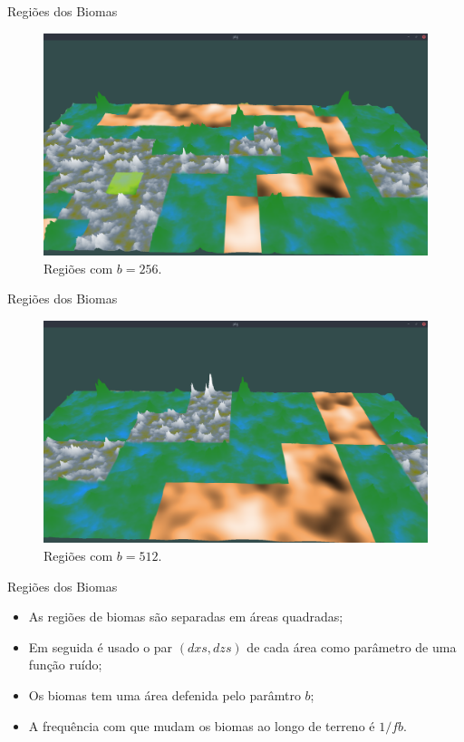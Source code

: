 \begin{frame}{Regiões dos Biomas}
    \begin{figure}[H]
        \centering
        \includegraphics[width=.9\textwidth]{img/re2bfb/b/256f4.png}
        \caption{Regiões com $b = 256$.}
        \label{fig:img_re2bfb_b_256f4}
    \end{figure}
    
    
\end{frame}

\begin{frame}{Regiões dos Biomas}
    \begin{figure}[H]
        \centering
        \includegraphics[width=.9\textwidth]{img/re2bfb/b/512f4.png}
        \caption{Regiões com $b = 512$.}
        \label{fig:img_re2bfb_b_512f4}
    \end{figure}
    
    
\end{frame}

\begin{frame}{Regiões dos Biomas}
    \begin{itemize} \setlength\itemsep{1em}
        \item As regiões de biomas são separadas em áreas quadradas;
        \item Em seguida é usado o par $(dxs, dzs)$ de cada área como parâmetro 
        de uma função ruído;
        \item Os biomas tem uma área defenida pelo parâmtro $b$;
        \item A frequência com que mudam os biomas ao longo de terreno 
        é $1/fb$.
    \end{itemize}
\end{frame}

